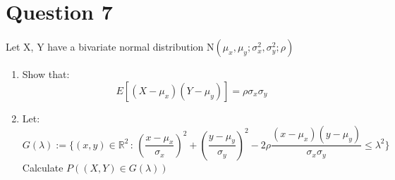 \documentclass[hidelinks]{article}
\begin{document}
\section{Question 7}
Let X, Y have a bivariate normal distribution $\mathrm{N} (\mu_x, \mu_y; \sigma^2_x, \sigma^2_y; \rho)$
\begin{enumerate}
    \item Show that:
    \begin{equation*}
        E[(X-\mu_x)(Y - \mu_y)] = \rho\sigma_x\sigma_y
    \end{equation*}
    \item Let:
    \begin{equation*}
        G(\lambda) := \{(x,y) \in \mathbb{R}^2\, : \, (\frac{x - \mu_x}{\sigma_x})^2 + (\frac{y - \mu_y}{\sigma_y})^2 - 2\rho\frac{(x-\mu_x)(y-\mu_y)}{\sigma_x\sigma_y} \leq \lambda^2\}
    \end{equation*}
    Calculate $P((X, Y ) \in G(\lambda))$
\end{enumerate}
\end{document}
